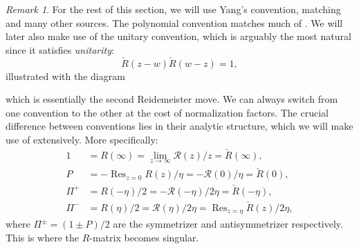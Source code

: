 \documentclass[11pt]{report}
\theoremstyle{definition}
\theoremstyle{remark}
\newtheorem*{remark}{Remark}
\theoremstyle{remark}
\begin{document}
\begin{remark}
For the rest of this section, we will use Yang's convention, matching \cite{book:molev} and many other sources. The polynomial convention matches much of \cite{book:arutyunov:betheAnsatz}. We will later also make use of the unitary convention, which is arguably the most natural since it satisfies \emph{unitarity}:
\begin{equation*}
\check R(z-w) \check{R}(w-z) = 1,
\end{equation*}
illustrated with the diagram
~\\
\begin{center}
\end{center}
which is essentially the second Reidemeister move. We can always switch from one convention to the other at the cost of normalization factors. The crucial difference between conventions lies in their analytic structure, which we will make use of extensively. More specifically:
\begin{align*}
1 &= R(\infty) = \lim_{z \to \infty} \mathcal{R}(z)/z = \check R(\infty), \\
P &= -\operatorname{Res}_{z=0} R(z)/\eta = -\mathcal{R}(0)/\eta = \check R(0), \\
\Pi^+ &= R(-\eta)/2 = -\mathcal{R}(-\eta)/2\eta = \check R(-\eta), \\
\Pi^- &= R(\eta)/2 = \mathcal{R}(\eta)/2\eta = \operatorname{Res}_{z=\eta} \check R(z)/2\eta,
\end{align*}
where $\Pi^\pm = (1 \pm P)/2$ are the symmetrizer and antisymmetrizer respectively. This is where the $R$-matrix becomes singular.
\end{remark}
\end{document}
